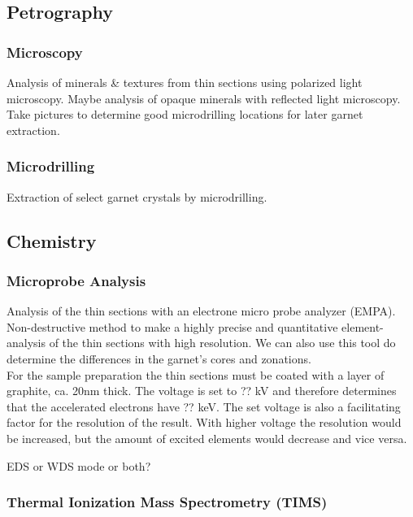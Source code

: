 \documentclass[a4paper,11pt,titlepage]{article}
\begin{document}
\subsection{Petrography}

\subsubsection{Microscopy}

Analysis of minerals \& textures from thin sections using polarized light microscopy. Maybe analysis of opaque minerals with reflected light microscopy. Take pictures to determine good microdrilling locations for later garnet extraction.


\subsubsection{Microdrilling}

Extraction of select garnet crystals by microdrilling.

\subsection{Chemistry}

\subsubsection{Microprobe Analysis}

Analysis of the thin sections with an electrone micro probe analyzer (EMPA). Non-destructive method to make a highly precise and quantitative element-analysis of the thin sections with high resolution. We can also use this tool do determine the differences in the garnet's cores and zonations.
\\
\noindent For the sample preparation the thin sections must be coated with a layer of graphite, ca. 20nm thick. The voltage is set to ?? kV and therefore determines that the accelerated electrons have ?? keV. The set voltage is also a facilitating factor for the resolution of the result. With higher voltage the resolution would be increased, but the amount of excited elements would decrease and vice versa. 

EDS or WDS mode or both?

\subsubsection{Thermal Ionization Mass Spectrometry (TIMS)}
\end{document}
